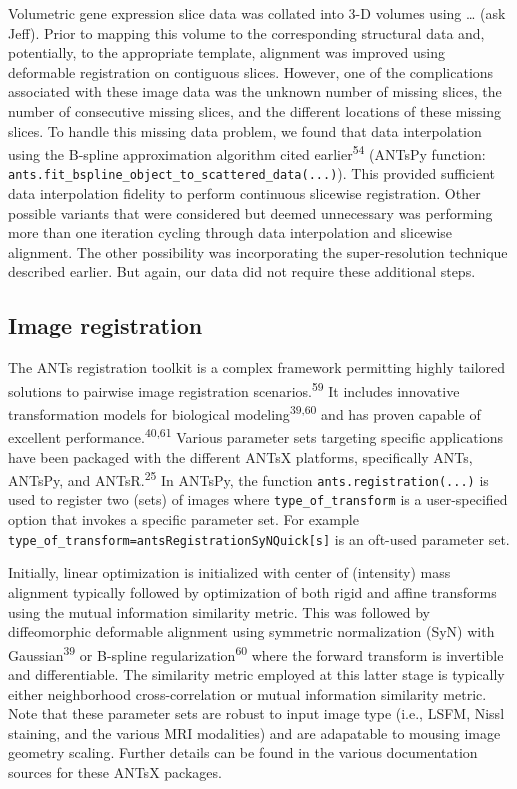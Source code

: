\documentclass[
  12pt,
]{article}
\begin{document}
Volumetric gene expression slice data was collated into 3-D volumes
using \ldots{} (ask Jeff). Prior to mapping this volume to the
corresponding structural data and, potentially, to the appropriate
template, alignment was improved using deformable registration on
contiguous slices. However, one of the complications associated with
these image data was the unknown number of missing slices, the number of
consecutive missing slices, and the different locations of these missing
slices. To handle this missing data problem, we found that data
interpolation using the B-spline approximation algorithm cited
earlier\textsuperscript{54} (ANTsPy function:
\texttt{ants.fit\_bspline\_object\_to\_scattered\_data(...)}). This
provided sufficient data interpolation fidelity to perform continuous
slicewise registration. Other possible variants that were considered but
deemed unnecessary was performing more than one iteration cycling
through data interpolation and slicewise alignment. The other
possibility was incorporating the super-resolution technique described
earlier. But again, our data did not require these additional steps.

\hypertarget{image-registration}{%
\subsection*{Image registration}\label{image-registration}}

The ANTs registration toolkit is a complex framework permitting highly
tailored solutions to pairwise image registration
scenarios.\textsuperscript{59} It includes innovative transformation
models for biological modeling\textsuperscript{39,60} and has proven
capable of excellent performance.\textsuperscript{40,61} Various
parameter sets targeting specific applications have been packaged with
the different ANTsX platforms, specifically ANTs, ANTsPy, and
ANTsR.\textsuperscript{25} In ANTsPy, the function
\texttt{ants.registration(...)} is used to register two (sets) of images
where \texttt{type\_of\_transform} is a user-specified option that
invokes a specific parameter set. For example
\texttt{type\_of\_transform=\textquotesingle{}antsRegistrationSyNQuick{[}s{]}\textquotesingle{}}
is an oft-used parameter set.

Initially, linear optimization is initialized with center of (intensity)
mass alignment typically followed by optimization of both rigid and
affine transforms using the mutual information similarity metric. This
was followed by diffeomorphic deformable alignment using symmetric
normalization (SyN) with Gaussian\textsuperscript{39} or B-spline
regularization\textsuperscript{60} where the forward transform is
invertible and differentiable. The similarity metric employed at this
latter stage is typically either neighborhood cross-correlation or
mutual information similarity metric. Note that these parameter sets are
robust to input image type (i.e., LSFM, Nissl staining, and the various
MRI modalities) and are adapatable to mousing image geometry scaling.
Further details can be found in the various documentation sources for
these ANTsX packages.
\end{document}

